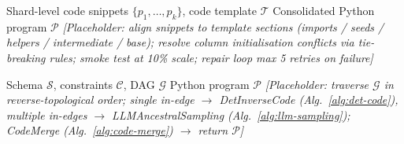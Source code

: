 \begin{algorithm}[t]
\caption{Deterministic Code Merge}
\label{alg:code-merge}
\begin{algorithmic}[1]
  \Require Shard-level code snippets $\{p_1,\ldots,p_k\}$, code template $\mathcal{T}$
  \Ensure Consolidated Python program $\mathcal{P}$
  \State \textit{[Placeholder: align snippets to template sections
         (imports / seeds / helpers / intermediate / base);
         resolve column initialisation conflicts via tie-breaking rules;
         smoke test at 10\% scale; repair loop max 5 retries on failure]}
\end{algorithmic}
\end{algorithm}

\begin{algorithm}[t]
\caption{Stage 4: Code Generation}
\label{alg:stage4}
\begin{algorithmic}[1]
  \Require Schema $\mathcal{S}$, constraints $\mathcal{C}$, DAG $\mathcal{G}$
  \Ensure Python program $\mathcal{P}$
  \State \textit{[Placeholder: traverse $\mathcal{G}$ in reverse-topological order;
         single in-edge $\to$ DetInverseCode (Alg.~\ref{alg:det-code}),
         multiple in-edges $\to$ LLMAncestralSampling (Alg.~\ref{alg:llm-sampling});
         CodeMerge (Alg.~\ref{alg:code-merge}) $\to$ return $\mathcal{P}$]}
\end{algorithmic}
\end{algorithm}

